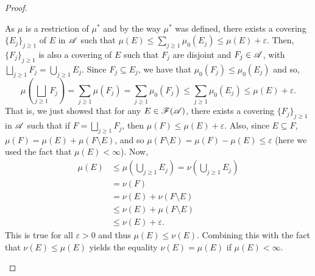 \begin{proof}
\begin{enumerate}
            As $\mu$ is a restriction of $\mu^*$ and by the way $\mu^*$ was defined, there exists a covering $\{E_j\}_{j \geq 1}$ of $E$ in $\mathscr{A}$ such that $\mu(E) \leq \sum_{j \geq 1} \mu_0(E_j) \leq \mu(E) + \varepsilon$. Then, $\{F_j\}_{j \geq 1}$ is also a covering of $E$ such that $F_j$ are disjoint and $F_j \in \mathscr{A}$, with $\bigsqcup_{j \geq 1} F_j = \bigcup _{j \geq1} E_j$. Since $F_j \subseteq E_j$, we have that $\mu_0(F_j) \leq \mu_0(E_j)$ and so, 
                \begin{equation*}
                    \mu \left( \bigsqcup_{j \geq 1} F_j \right) = \sum_{j \geq1} \mu(F_j) = \sum_{j \geq 1} \mu_0(F_j) \leq \sum_{j \geq 1} \mu_0(E_j) \leq \mu(E) + \varepsilon.
                \end{equation*}
            That is, we just showed that for any $E \in \mathscr{F}(\mathscr{A})$, there exists a covering $\{F_j\}_{j \geq 1}$ in $\mathscr{A}$ such that if $F = \bigsqcup_{j \geq 1} F_j$, then $\mu(F) \leq \mu(E) + \varepsilon$. Also, since $E \subseteq F$, $\mu(F) = \mu(E) + \mu(F \setminus E)$, and so $\mu(F \setminus E) = \mu(F) - \mu(E) \leq \varepsilon$ (here we used the fact that $\mu(E) < \infty$). Now, 
            \begin{align*}
                \mu(E) &\leq \mu(\bigcup_{j \geq 1} E_j) = \nu(\bigcup_{j \geq 1} E_j) \tag{from (9)}\\
                &= \nu(F) \\
                &= \nu(E) + \nu(F \setminus E) \tag{as $\nu$ is a measure} \\
                &\leq \nu(E) + \mu(F \setminus E) \\
                &\leq \nu(E) + \varepsilon.  
            \end{align*}
            This is true for all $\varepsilon > 0$ and thus $\mu(E) \leq \nu(E)$. Combining this with the fact that $\nu(E) \leq \mu(E)$ yields the equality $\nu(E) = \mu(E)$ if $\mu(E) < \infty$.


\end{enumerate}
\end{proof}
